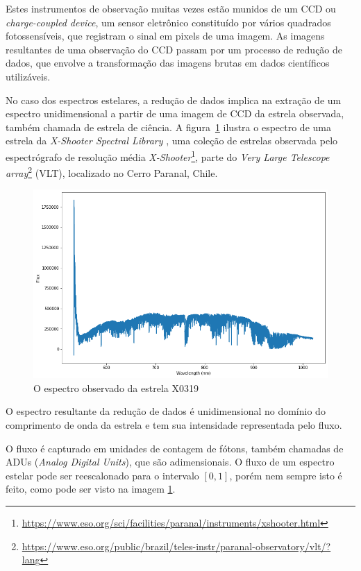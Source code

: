 Estes instrumentos de observação muitas vezes estão munidos de um CCD ou \textit{charge-coupled device}, um sensor eletrônico constituído por vários quadrados fotossensíveis, que registram o sinal em pixels de uma imagem. As imagens resultantes de uma observação do CCD passam por um processo de redução de dados, que envolve a transformação das imagens brutas em dados científicos utilizáveis.   

No caso dos espectros estelares, a redução de dados implica na extração de um espectro unidimensional a partir de uma imagem de CCD da estrela observada, também chamada de estrela de ciência. A figura~\ref{fig:x0319-obs-spectrum} ilustra o espectro de uma estrela da \textit{X-Shooter Spectral Library} \citep{Chen2014TheXS}, uma coleção de estrelas observada pelo espectrógrafo de resolução média \textit{X-Shooter}\footnote{\url{https://www.eso.org/sci/facilities/paranal/instruments/xshooter.html}}, parte do \textit{Very Large Telescope array}\footnote{\url{https://www.eso.org/public/brazil/teles-instr/paranal-observatory/vlt/?lang}} (VLT), localizado no Cerro Paranal, Chile.  

\begin{figure}[htb]
\centering
\includegraphics[width=15cm]{figuras/X0319_obs_spectrum.png}
\caption{O espectro observado da estrela X0319}
\label{fig:x0319-obs-spectrum}
\end{figure}

O espectro resultante da redução de dados é unidimensional no domínio do comprimento de onda da estrela e tem sua intensidade representada pelo fluxo. 

O fluxo é capturado em unidades de contagem de fótons, também chamadas de ADUs (\textit{Analog Digital Units}), que são adimensionais. O fluxo de um espectro estelar pode ser reescalonado para o intervalo $[0, 1]$, porém nem sempre isto é feito, como pode ser visto na imagem \ref{fig:x0319-obs-spectrum}. 

